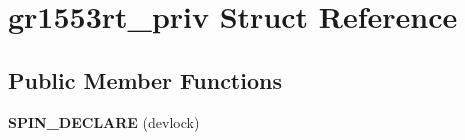 \hypertarget{structgr1553rt__priv}{}\section{gr1553rt\+\_\+priv Struct Reference}
\label{structgr1553rt__priv}
\subsection*{Public Member Functions}
\begin{DoxyCompactItemize}
\item 
\mbox{\label{structgr1553rt__priv_ab1cbd767aa87666bb9b22eaa5a269024}} 
{\bfseries S\+P\+I\+N\+\_\+\+D\+E\+C\+L\+A\+RE} (devlock)
\end{DoxyCompactItemize}
